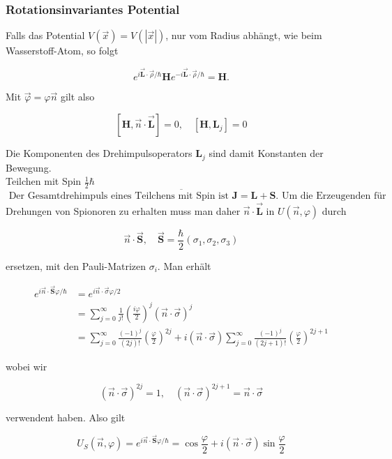 \documentclass[10pt, letterpaper]{article}
\begin{document}
\subsubsection*{Rotationsinvariantes Potential}
Falls das Potential $V(\vec{x})=V(|\vec{x}|)$, nur vom Radius abhängt, wie beim Wasserstoff-Atom, so folgt

$$
e^{i \overrightarrow{\mathbf{L}} \cdot \vec{\rho} / \hbar} \mathbf{H} e^{-i \overrightarrow{\mathbf{L}} \cdot \vec{\rho} / \hbar}=\mathbf{H} .
$$

Mit $\vec{\varphi}=\varphi \vec{n}$ gilt also

$$
[\mathbf{H}, \vec{n} \cdot \overrightarrow{\mathbf{L}}]=0, \quad\left[\mathbf{H}, \mathbf{L}_{j}\right]=0
$$

Die Komponenten des Drehimpulsoperators $\mathbf{L}_{j}$ sind damit Konstanten der Bewegung.\\
Teilchen mit Spin $\frac{1}{2} \hbar$\\
$\overline{\text { Der Gesamtdrehimpuls eines Teilchens mit Spin ist } \mathbf{J}=\mathbf{L}+\mathbf{S} \text {. Um die Erzeugenden für }}$ Drehungen von Spionoren zu erhalten muss man daher $\vec{n} \cdot \overrightarrow{\mathbf{L}}$ in $U(\vec{n}, \varphi)$ durch

$$
\vec{n} \cdot \overrightarrow{\mathbf{S}}, \quad \overrightarrow{\mathbf{S}}=\frac{\hbar}{2}\left(\sigma_{1}, \sigma_{2}, \sigma_{3}\right)
$$

ersetzen, mit den Pauli-Matrizen $\sigma_{i}$. Man erhält

$$
\begin{aligned}
e^{i \vec{n} \cdot \overrightarrow{\mathbf{S}} \varphi / \hbar} & =e^{i \vec{n} \cdot \vec{\sigma} \varphi / 2} \\
& =\sum_{j=0}^{\infty} \frac{1}{j!}\left(\frac{i \varphi}{2}\right)^{j}(\vec{n} \cdot \vec{\sigma})^{j} \\
& =\sum_{j=0}^{\infty} \frac{(-1)^{j}}{(2 j)!}\left(\frac{\varphi}{2}\right)^{2 j}+i(\vec{n} \cdot \vec{\sigma}) \sum_{j=0}^{\infty} \frac{(-1)^{j}}{(2 j+1)!}\left(\frac{\varphi}{2}\right)^{2 j+1}
\end{aligned}
$$

wobei wir

$$
(\vec{n} \cdot \vec{\sigma})^{2 j}=1, \quad(\vec{n} \cdot \vec{\sigma})^{2 j+1}=\vec{n} \cdot \vec{\sigma}
$$

verwendent haben. Also gilt

$$
U_{S}(\vec{n}, \varphi)=e^{i \vec{n} \cdot \overrightarrow{\mathbf{S}} \varphi / \hbar}=\cos \frac{\varphi}{2}+i(\vec{n} \cdot \vec{\sigma}) \sin \frac{\varphi}{2}
$$
\end{document}
